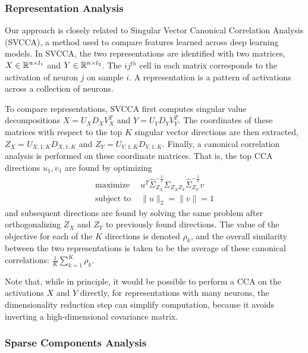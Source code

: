 \subsubsection{Representation Analysis}

Our approach is closely related to Singular Vector Canonical Correlation
Analysis (SVCCA), a method used to compare features learned across deep learning
models. In SVCCA, the two representations are identified with two matrices, $X
\in \mathbb{R}^{n \times l_{1}}$ and $Y \in \mathbb{R}^{n \times l_{2}}$. The $ij^{th}$
cell in each matrix corresponds to the activation of neuron $j$ on sample $i$. A
representation is a pattern of activations across a collection of neurons.

To compare representations, SVCCA first computes singular value decompositions
$X = U_{X}D_{X}V_{X}^{T}$ and $Y = U_{Y}D_{Y}V_{Y}^{T}$. The coordinates of
these matrices with respect to the top $K$ singular vector directions are then
extracted, $Z_{X} = U_{X, 1:K}D_{X, 1:K}$ and $Z_{Y} = U_{Y, 1:K}D_{Y, 1:K}$.
Finally, a canonical correlation analysis is performed on these coordinate
matrices. That is, the top CCA directions $u_{1}, v_{1}$ are found by optimizing
\begin{align*}
  \text{maximize }& u^{T}\hat{\Sigma}_{Z_{X}}^{-\frac{1}{2}}\hat{\Sigma}_{Z_{X}Z_{Y}}\hat{\Sigma}_{Z_{Y}}^{-\frac{1}{2}}v \\
  \text{subject to } & \|u\|_{2} = \|v\| = 1
\end{align*}
and subsequent directions are found by solving the same problem after
orthogonalizing $Z_{X}$ and $Z_{Y}$ to previously found directions. The value of
the objective for each of the $K$ directions is denoted $\rho_{k}$, and the
overall similarity between the two representations is taken to be the average of
these canonical correlations: $\frac{1}{K}\sum_{k = 1}^{K} \rho_{k}$.

Note that, while in principle, it would be possible to perform a CCA on the
activations $X$ and $Y$ directly, for representations with many neurons, the
dimensionality reduction step can simplify computation, because it avoids
inverting a high-dimensional covariance matrix.

\subsubsection{Sparse Components Analysis}

